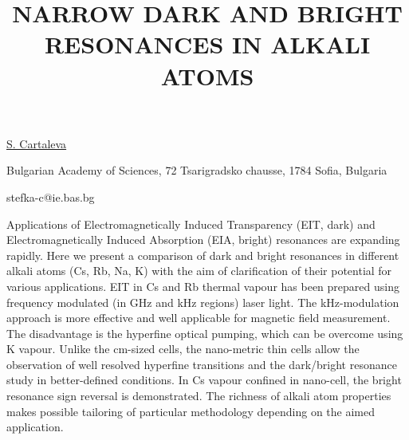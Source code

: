 \title{NARROW DARK AND BRIGHT RESONANCES IN ALKALI ATOMS}

\underline{S. Cartaleva} 

{\normalsize{\vspace{-4mm}
Bulgarian Academy of Sciences, 72 Tsarigradsko chausse, 1784 Sofia,
Bulgaria

\email stefka-c@ie.bas.bg}}

Applications of Electromagnetically Induced Transparency (EIT, dark) and Electromagnetically Induced Absorption (EIA, bright) resonances are expanding rapidly.
Here we present a comparison of dark and bright resonances in different alkali atoms (Cs, Rb, Na, K) with the aim of clarification of their potential for various applications.
EIT in Cs and Rb thermal vapour has been prepared using frequency modulated (in GHz and kHz regions) laser light. The kHz-modulation approach is more effective and well applicable for magnetic field measurement. The disadvantage is the hyperfine optical pumping, which can be overcome using K vapour.
Unlike the cm-sized cells, the nano-metric thin cells allow the observation of well resolved hyperfine transitions and the dark/bright resonance study in better-defined conditions. In Cs vapour confined in nano-cell, the bright resonance sign reversal is demonstrated.
The richness of alkali atom properties makes possible tailoring of particular methodology depending on the aimed application.

\vspace{\baselineskip}